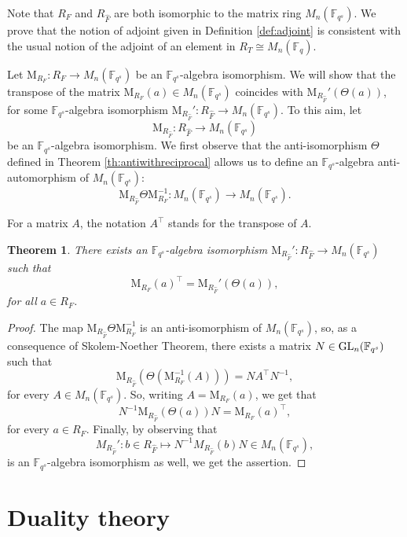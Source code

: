 \documentclass[a4paper, 11pt]{article}
\newtheorem{theorem}{Theorem}[section]
\newcommand{\F}{{\mathbb F}}
\newcommand{\GL}{\hbox{{\rm GL}}}
\newcommand{\M}{\mathrm{M}}
\begin{document}
Note that $R_F$ and $R_{\hat{F}}$ are both isomorphic to the matrix ring $M_n(\F_{q^s})$. We prove that the notion of adjoint given in Definition \ref{def:adjoint} is consistent with the usual notion of the adjoint of an element in $R_T \cong M_n(\F_q)$. 

Let \(\M_{R_F} : R_F \longrightarrow M_n(\F_{q^s})\)
be an $\F_{q^s}$-algebra isomorphism. We will show that the transpose of the matrix $\M_{R_F}(a) \in M_n(\F_{q^s})$ coincides with $\mathrm{M}_{R_{\hat{F}}}'(\Theta(a))$, for some $\F_{q^s}$-algebra isomorphism $\M_{R_{\hat{F}}}':R_{\hat{F}} \rightarrow M_n(\F_{q^s})$. To this aim, let 
\[\M_{R_{\hat{F}}}:R_{\hat{F}} \longrightarrow M_n(\F_{q^s})\]
be an $\F_{q^s}$-algebra isomorphism. We first observe that the anti-isomorphism $\Theta$ defined in Theorem \ref{th:antiwithreciprocal} allows us to define an $\F_{q^s}$-algebra anti-automorphism of $M_n(\F_{q^s})$: \[ \M_{R_{\hat{F}}} \Theta \M_{R_F}^{-1} : M_n(\F_{q^s}) \to M_n(\F_{q^s}) .\]

For a matrix \(A\), the notation \(A^\top\) stands for the transpose of \(A\).





\begin{theorem} \label{th:transposequotient}
There exists an $\F_{q^s}$-algebra isomorphism $\M_{R_{\hat{F}}}':R_{\hat{F}} \rightarrow M_n(\F_{q^s})$ such that 
\[
\M_{R_F}(a)^{\top}= \M_{R_{\hat{F}}}'(\Theta(a)),
\]
for all $a \in R_F$.
\end{theorem}

\begin{proof}
The map $\M_{R_{\hat{F}}} \Theta \M_{R_F}^{-1}$ is an anti-isomorphism of $M_n(\F_{q^s})$, so, as a consequence of Skolem-Noether Theorem, there exists a matrix $N \in \GL_n(\F_{q^s})$ such that 
\[\M_{R_{\hat{F}}}(\Theta(\M_{R_F}^{-1}(A)))=N A^{\top} N^{-1},\]
for every $A \in M_n(\F_{q^s})$. So, writing $A=\M_{R_F}(a)$, we get that
\[
N^{-1}\M_{R_{\hat{F}}}(\Theta(a))N=\M_{R_F}(a)^{\top},
\]
for every $a \in R_F$. Finally, by observing that
\[
M_{R_{\hat{F}}}': b \in R_{\hat{F}} \longmapsto N^{-1} M_{R_{\hat{F}}}(b) N \in M_n(\F_{q^s})
,\] 
is an $\F_{q^s}$-algebra isomorphism as well, we get the assertion.
\end{proof}



\section{Duality theory} \label{sec:duality}
\end{document}
